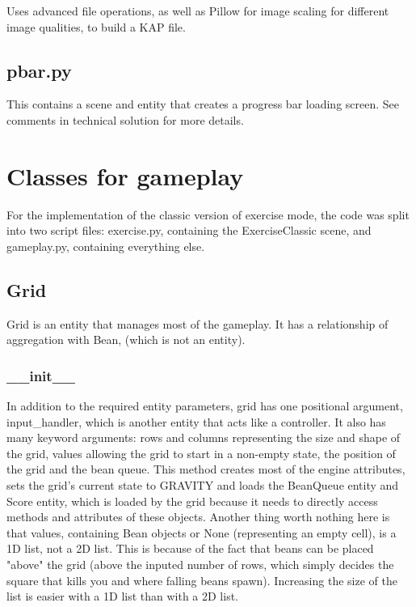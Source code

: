 \documentclass{report}
\begin{document}
Uses advanced file operations, as well as Pillow for image scaling for different image qualities, to build a KAP file.

\subsection{pbar.py}

This contains a scene and entity that creates a progress bar loading screen. See comments in technical solution for more details.

\section{Classes for gameplay}

For the implementation of the classic version of exercise mode, the code was split into two script files: exercise.py, containing the ExerciseClassic scene, and gameplay.py, containing everything else.

\subsection{Grid}

Grid is an entity that manages most of the gameplay. It has a relationship of aggregation with Bean, (which is not an entity).

\subsubsection{\_\_init\_\_}

In addition to the required entity parameters, grid has one positional argument, input\_handler, which is another entity that acts like a controller. It also has many keyword arguments: rows and columns representing the size and shape of the grid, values allowing the grid to start in a non-empty state, the position of the grid and the bean queue. This method creates most of the engine attributes, sets the grid's current state to GRAVITY and loads the BeanQueue entity and Score entity, which is loaded by the grid because it needs to directly access methods and attributes of these objects. Another thing worth nothing here is that values, containing Bean objects or None (representing an empty cell), is a 1D list, not a 2D list. This is because of the fact that beans can be placed "above" the grid (above the inputed number of rows, which simply decides the square that kills you and where falling beans spawn). Increasing the size of the list is easier with a 1D list than with a 2D list.
\end{document}
